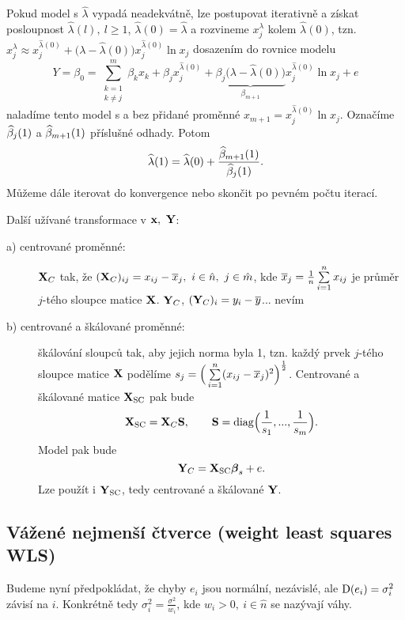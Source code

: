 \begin{remark}
Pokud model s $\widehat{\lambda}$ vypadá neadekvátně, lze postupovat iterativně a získat posloupnost $\widehat{\lambda}(l),~l\geq1$, $\widehat{\lambda}(0)=\widehat{\lambda}$ a rozvineme $x_j^\lambda$ kolem $\widehat{\lambda}(0)$, tzn. \\ $x_j^\lambda\approx x_j^{\widehat{\lambda}(0)}+\big(\lambda-\widehat{\lambda}(0)\big)x_j^{\widehat{\lambda}(0)}\ln x_j$ dosazením do rovnice modelu 
$$
Y= \beta_0=\sum_{\substack{k=1 \\ k\neq j}}^m \beta_k x_k+\beta_j x_j^{\widehat{\lambda}(0)}+\underbrace{\beta_j\big(\lambda-\widehat{\lambda}(0)\big)}_{\beta_{m+1}}x_j^{\widehat{\lambda}(0)}\ln x_j+e
$$ 
naladíme tento model s a bez přidané proměnné $x_{m+1}=x_j^{\widehat{\lambda}(0)}\ln x_j$. Označíme $\widehat{\beta}_j(1)$ a $\widehat{\beta}_{m+1}(1)$ příslušné odhady. Potom
$$
\widehat{\lambda}(1)=\widehat{\lambda}(0)+\frac{\widehat{\beta}_{m+1}(1)}{\widehat{\beta}_j(1)}.
$$
Můžeme dále iterovat do konvergence nebo skončit po pevném počtu iterací.
\end{remark}

\begin{remark}
	Další užívané transformace v $\textbf{x},~\textbf{Y}$:\begin{description}
	\item[a) centrované proměnné:] $\textbf{X}_C$ tak, že $(\textbf{X}_C)_{ij}=x_{ij}-\overline{x}_j,~i\in\hat{n},~j\in\hat{m}$, kde $\overline{x}_j=\frac{1}{n}\sum\limits_{i=1}^{n} x_{ij}$ je průměr $j$-tého sloupce matice $\textbf{X}$. $\textbf{Y}_C$, $(\textbf{Y}_C)_i=y_i-\overline{y}$... nevím
	\item[b) centrované a škálované proměnné:] škálování sloupců tak, aby jejich norma byla 1, tzn. každý prvek $j$-tého sloupce matice $\textbf{X}$ podělíme $s_j=\Big(\sum\limits_{i=1}^{n}(x_{ij}-\overline{x}_j)^2\Big)^{\frac{1}{2}}$. Centrované a škálované matice $\textbf{X}_\mathrm{SC}$ pak bude 
	$$
	\textbf{X}_\mathrm{SC}=\textbf{X}_C\textbf{S},\qquad \textbf{S}=\mathrm{diag}\Big(\frac{1}{s_1},...,\frac{1}{s_m}\Big).
	$$
	Model pak bude 
	$$
	\textbf{Y}_C=\textbf{X}_\mathrm{SC}\boldsymbol{\beta}_s+e.$$ Lze použít i $\textbf{Y}_\mathrm{SC}$, tedy centrované a škálované $\textbf{Y}$.
	\end{description}
\end{remark}

\subsection*{Vážené nejmenší čtverce (weight least squares WLS)}
Budeme nyní předpokládat, že chyby $e_i$ jsou normální, nezávislé, ale $\mathrm{D}(e_i)=\sigma_i^2$ závisí na $i$. Konkrétně tedy $\sigma_i^2=\frac{\sigma^2}{w_i}$, kde $w_i>0,~i\in\hat{n}$ se nazývají váhy.

